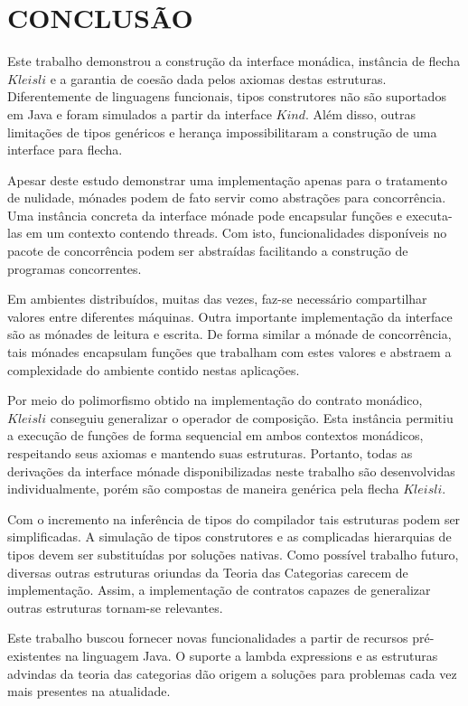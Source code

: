 \documentclass[10pt, conference]{IEEEtran}
\begin{document}
\section{CONCLUSÃO}
\label{sec:conc}

Este trabalho demonstrou a construção da interface monádica, instância de flecha  $Kleisli$ e a garantia de coesão dada pelos axiomas destas estruturas. Diferentemente de linguagens funcionais, tipos construtores não são suportados em Java e foram simulados a partir da interface $Kind$. Além disso, outras limitações de tipos genéricos e herança impossibilitaram a construção de uma interface para flecha.

Apesar deste estudo demonstrar uma implementação apenas para o tratamento de nulidade, mónades podem de fato servir como abstrações para concorrência. Uma instância concreta da interface mónade pode encapsular funções e executa-las em um contexto contendo threads. Com isto, funcionalidades disponíveis no pacote de concorrência podem ser abstraídas facilitando a construção de programas concorrentes.

Em ambientes distribuídos, muitas das vezes, faz-se necessário compartilhar valores entre diferentes máquinas. Outra importante implementação da interface são as mónades de leitura e escrita. De forma similar a mónade de concorrência, tais mónades encapsulam funções que trabalham com estes valores e abstraem a complexidade do ambiente contido nestas aplicações.

Por meio do polimorfismo obtido na implementação do contrato monádico, $Kleisli$ conseguiu generalizar o operador de composição. Esta instância permitiu a execução de funções de forma sequencial em ambos contextos monádicos, respeitando seus axiomas e mantendo suas estruturas. Portanto, todas as derivações da interface mónade disponibilizadas neste trabalho são desenvolvidas individualmente, porém são compostas de maneira genérica pela flecha $Kleisli$.

Com o incremento na inferência de tipos do compilador tais estruturas podem ser simplificadas. A simulação de tipos construtores e as complicadas hierarquias de tipos devem ser substituídas por soluções nativas. Como possível trabalho futuro, diversas outras estruturas oriundas da Teoria das Categorias carecem de implementação. Assim, a implementação de contratos capazes de generalizar outras estruturas tornam-se relevantes.

Este trabalho buscou fornecer novas funcionalidades a partir de recursos pré-existentes na linguagem Java. O suporte a lambda expressions e as estruturas advindas da teoria das categorias dão origem a soluções para problemas cada vez mais presentes na atualidade.



\end{document}
